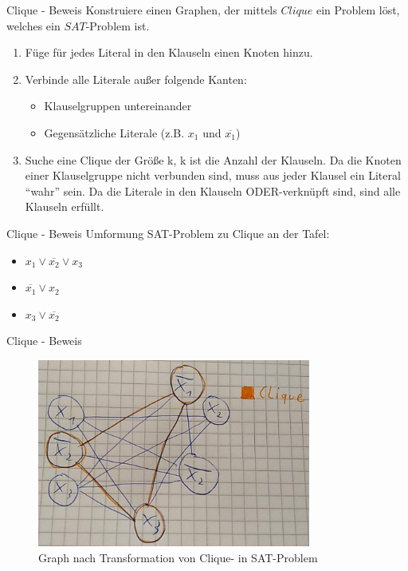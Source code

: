 \documentclass[12pt,handout,notes=dontshow,xcolor=table]{beamer}
\begin{document}
\begin{frame}{Clique - Beweis}
Konstruiere einen Graphen, der mittels \(Clique\) ein Problem löst, welches ein \(SAT\)-Problem ist.
\begin{enumerate}
\item Füge für jedes Literal in den Klauseln einen Knoten hinzu.
\pause
\item Verbinde alle Literale außer folgende Kanten:
\begin{itemize}
\item Klauselgruppen untereinander
\item Gegensätzliche Literale (z.B. \(x_1\) und \(\overline{x_1}\))
\end{itemize}
\pause
\item Suche eine Clique der Größe k, k ist die Anzahl der Klauseln. Da die Knoten einer Klauselgruppe nicht verbunden sind, muss aus jeder Klausel ein Literal ``wahr'' sein. Da die Literale in den Klauseln ODER-verknüpft sind, sind alle Klauseln erfüllt. \cite{weitz}
\end{enumerate}
\end{frame}

\begin{frame}{Clique - Beweis}
Umformung SAT-Problem zu Clique an der Tafel:
\begin{itemize}
\item \(x_1 \vee \overline{x_2} \vee x_3\)
\item \(\overline{x_1} \vee x_2\)
\item \(x_3 \vee \overline{x_2}\)

\end{itemize}
\end{frame}

\begin{frame}{Clique - Beweis}
\begin{figure}
\includegraphics[width=9cm]{figures/clique_sat}
\caption{Graph nach Transformation von Clique- in SAT-Problem}
\end{figure}
\end{frame}
\end{document}
